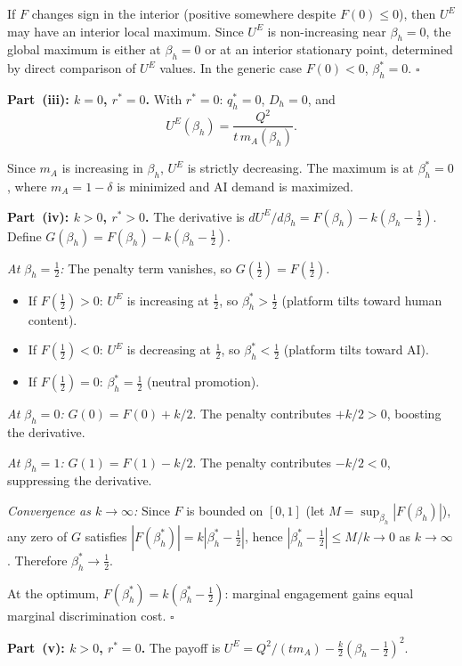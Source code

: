 \documentclass[mnsc,nonblindrev]{informs3_NoOR}
\begin{document}
If $F$ changes sign in the interior (positive somewhere despite $F(0) \leq 0$), then $U^E$ may have an interior local maximum. Since $U^E$ is non-increasing near $\beta_h=0$, the global maximum is either at $\beta_h=0$ or at an interior stationary point, determined by direct comparison of $U^E$ values. In the generic case $F(0)<0$, $\beta_h^*=0$. \hfill$\square$
 
\medskip\noindent\textbf{Part~(iii): $k=0$, $r^*=0$.}
With $r^*=0$: $q_h^*=0$, $D_h=0$, and
\[
U^E(\beta_h) = \frac{Q^2}{t\,m_A(\beta_h)}.
\]
 
Since $m_A$ is increasing in $\beta_h$, $U^E$ is strictly decreasing. The maximum is at $\beta_h^*=0$, where $m_A=1-\delta$ is minimized and AI demand is maximized.
 
 
\medskip\noindent\textbf{Part~(iv): $k>0$, $r^*>0$.}
The derivative is $dU^E/d\beta_h = F(\beta_h)-k(\beta_h-\frac{1}{2})$. Define $G(\beta_h) = F(\beta_h)-k(\beta_h-\frac{1}{2})$.
 
\emph{At $\beta_h=\frac{1}{2}$:} The penalty term vanishes, so $G(\frac{1}{2})=F(\frac{1}{2})$.
\begin{itemize}
\item If $F(\frac{1}{2})>0$: $U^E$ is increasing at $\frac{1}{2}$, so $\beta_h^*>\frac{1}{2}$ (platform tilts toward human content).
\item If $F(\frac{1}{2})<0$: $U^E$ is decreasing at $\frac{1}{2}$, so $\beta_h^*<\frac{1}{2}$ (platform tilts toward AI).
\item If $F(\frac{1}{2})=0$: $\beta_h^*=\frac{1}{2}$ (neutral promotion).
\end{itemize}
 
\emph{At $\beta_h=0$:} $G(0)=F(0)+k/2$. The penalty contributes $+k/2>0$, boosting the derivative.
 
\emph{At $\beta_h=1$:} $G(1)=F(1)-k/2$. The penalty contributes $-k/2<0$, suppressing the derivative.
 
\emph{Convergence as $k \to \infty$:} Since $F$ is bounded on $[0,1]$ (let $M=\sup_{\beta_h}|F(\beta_h)|$), any zero of $G$ satisfies $|F(\beta_h^*)|=k|\beta_h^*-\frac{1}{2}|$, hence $|\beta_h^*-\frac{1}{2}| \leq M/k \to 0$ as $k \to \infty$. Therefore $\beta_h^* \to \frac{1}{2}$.
 
At the optimum, $F(\beta_h^*)=k(\beta_h^*-\frac{1}{2})$: marginal engagement gains equal marginal discrimination cost. \hfill$\square$
 
\medskip\noindent\textbf{Part~(v): $k>0$, $r^*=0$.}
The payoff is $U^E = Q^2/(tm_A) - \frac{k}{2}(\beta_h-\frac{1}{2})^2$.
 
\end{document}
